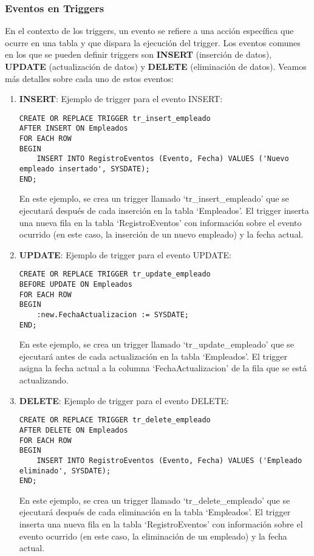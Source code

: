 \documentclass[executivepaper]{article}
\begin{document}
\subsubsection*{Eventos en Triggers}

En el contexto de los triggers, un evento se refiere a una acción específica que ocurre en una tabla y que dispara la ejecución del trigger. Los eventos comunes en los que se pueden definir triggers son \textbf{INSERT} (inserción de datos), \textbf{UPDATE} (actualización de datos) y \textbf{DELETE} (eliminación de datos). Veamos más detalles sobre cada uno de estos eventos:

\begin{enumerate}
    \item \textbf{INSERT}: Ejemplo de trigger para el evento INSERT:
    
\begin{lstlisting}
CREATE OR REPLACE TRIGGER tr_insert_empleado
AFTER INSERT ON Empleados
FOR EACH ROW
BEGIN
    INSERT INTO RegistroEventos (Evento, Fecha) VALUES ('Nuevo empleado insertado', SYSDATE);
END;
\end{lstlisting}
    
    En este ejemplo, se crea un trigger llamado \enquote*{tr\_insert\_empleado} que se ejecutará después de cada inserción en la tabla \enquote*{Empleados}. El trigger inserta una nueva fila en la tabla \enquote*{RegistroEventos} con información sobre el evento ocurrido (en este caso, la inserción de un nuevo empleado) y la fecha actual.
    
    \item \textbf{UPDATE}: Ejemplo de trigger para el evento UPDATE:
    
\begin{lstlisting}
CREATE OR REPLACE TRIGGER tr_update_empleado
BEFORE UPDATE ON Empleados
FOR EACH ROW
BEGIN
    :new.FechaActualizacion := SYSDATE;
END;
\end{lstlisting}
    
    En este ejemplo, se crea un trigger llamado \enquote*{tr\_update\_empleado} que se ejecutará antes de cada actualización en la tabla \enquote*{Empleados}. El trigger asigna la fecha actual a la columna \enquote*{FechaActualizacion} de la fila que se está actualizando.
    
    \item \textbf{DELETE}: Ejemplo de trigger para el evento DELETE:
    
\begin{lstlisting}
CREATE OR REPLACE TRIGGER tr_delete_empleado
AFTER DELETE ON Empleados
FOR EACH ROW
BEGIN
    INSERT INTO RegistroEventos (Evento, Fecha) VALUES ('Empleado eliminado', SYSDATE);
END;
\end{lstlisting}
    
    En este ejemplo, se crea un trigger llamado \enquote*{tr\_delete\_empleado} que se ejecutará después de cada eliminación en la tabla \enquote*{Empleados}. El trigger inserta una nueva fila en la tabla \enquote*{RegistroEventos} con información sobre el evento ocurrido (en este caso, la eliminación de un empleado) y la fecha actual.
\end{enumerate}
\end{document}
